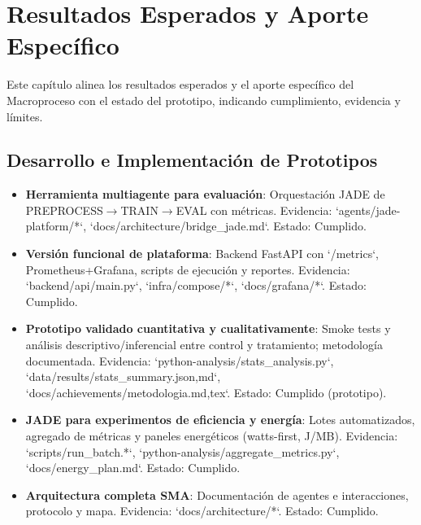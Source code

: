 \chapter{Resultados Esperados y Aporte Específico}
\label{chap:resultados-aporte}

Este capítulo alinea los resultados esperados y el aporte específico del Macroproceso con el estado del prototipo, indicando cumplimiento, evidencia y límites.

\section{Desarrollo e Implementación de Prototipos}
\begin{itemize}
  \item \textbf{Herramienta multiagente para evaluación}: Orquestación JADE de PREPROCESS$\to$TRAIN$\to$EVAL con métricas. Evidencia: `agents/jade-platform/*`, `docs/architecture/bridge_jade.md`. Estado: Cumplido.
  \item \textbf{Versión funcional de plataforma}: Backend FastAPI con `/metrics`, Prometheus+Grafana, scripts de ejecución y reportes. Evidencia: `backend/api/main.py`, `infra/compose/*`, `docs/grafana/*`. Estado: Cumplido.
  \item \textbf{Prototipo validado cuantitativa y cualitativamente}: Smoke tests y análisis descriptivo/inferencial entre control y tratamiento; metodología documentada. Evidencia: `python-analysis/stats_analysis.py`, `data/results/stats_summary.{json,md}`, `docs/achievements/metodologia.{md,tex}`. Estado: Cumplido (prototipo).
  \item \textbf{JADE para experimentos de eficiencia y energía}: Lotes automatizados, agregado de métricas y paneles energéticos (watts-first, J/MB). Evidencia: `scripts/run_batch.*`, `python-analysis/aggregate_metrics.py`, `docs/energy_plan.md`. Estado: Cumplido.
  \item \textbf{Arquitectura completa SMA}: Documentación de agentes e interacciones, protocolo y mapa. Evidencia: `docs/architecture/*`. Estado: Cumplido.
\end{itemize}

